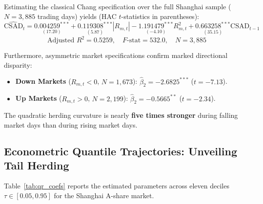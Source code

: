 \documentclass[12pt, a4paper]{article}
\begin{document}
Estimating the classical Chang specification over the full Shanghai sample ($N=3{,}885$ trading days) yields (HAC $t$-statistics in parentheses):
\begin{equation}
  \widehat{\mathrm{CSAD}}_t
  = \underset{(17.20)}{0.004259^{***}}
  + \underset{(5.87)}{0.119308^{***}} |R_{m,t}|
  - \underset{(-4.10)}{1.191479^{***}} R_{m,t}^2
  + \underset{(35.15)}{0.663258^{***}} \mathrm{CSAD}_{t-1}
\end{equation}
\[
  \text{Adjusted } R^2 = 0.5259,\quad F\text{-stat} = 532.0,\quad N = 3{,}885
\]

Furthermore, asymmetric market specifications confirm marked directional disparity:
\begin{itemize}
  \item \textbf{Down Markets} ($R_{m,t} < 0$, $N=1{,}673$): $\hat\beta_2 = -2.6825^{***}$ ($t=-7.13$).
  \item \textbf{Up Markets} ($R_{m,t} > 0$, $N=2{,}199$): $\hat\beta_2 = -0.5665^{**}$ ($t=-2.34$).
\end{itemize}
The quadratic herding curvature is nearly \textbf{five times stronger} during falling market days than during rising market days.

\subsection{Econometric Quantile Trajectories: Unveiling Tail Herding}

Table~\ref{tab:qr_coefs} reports the estimated parameters across eleven deciles $\tau \in [0.05, 0.95]$ for the Shanghai A-share market.
\end{document}
